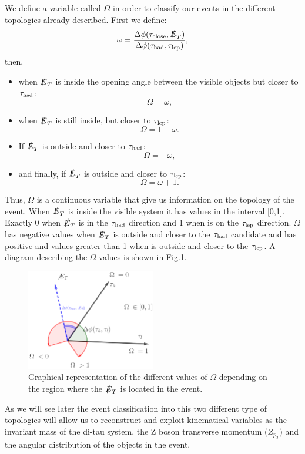 We define a variable called $\Omega$ in order to classify our events in the different topologies already described. First we define:
\begin{equation}
	\omega=\frac{\Delta\phi(\tau_{\text{close}},\slashed{E}_T)}{\Delta\phi(\tau_\text{had},\tau_\text{lep})},
\end{equation}
then,
\begin{itemize}
	\item when $\slashed{E}_T$ is inside the opening angle between the visible objects but closer to $\tau_\text{had}$:
	\begin{equation}
		\Omega=\omega,
	\end{equation}
	\item when $\slashed{E}_T$ is still inside, but closer to $\tau_\text{lep}$:
	\begin{equation}
		\Omega=1-\omega.
	\end{equation}
	\item If $\slashed{E}_T$ is outside and closer to $\tau_\text{had}$:
	\begin{equation}
		\Omega=-\omega,
	\end{equation}
	\item and finally, if $\slashed{E}_T$ is outside and closer to $\tau_\text{lep}$:
	\begin{equation}
		\Omega=\omega+1.
	\end{equation}
\end{itemize}
Thus, $\Omega$ is a continuous variable that give us information on the topology of the event. When $\slashed{E}_T$ is inside the visible system it has values in the interval [0,1]. Exactly 0 when $\slashed{E}_T$ is in the $\tau_\text{had}$ direction and 1 when is on the $\tau_\text{lep}$ direction. $\Omega$ has negative values when $\slashed{E}_T$ is outside and closer to the $\tau_\text{had}$ candidate and has positive and values greater than 1 when is outside and closer to the $\tau_\text{lep}$. A diagram describing the $\Omega$ values is shown in Fig.\ref{Fig8}.
\begin{figure}[h]
	\centering
	\includegraphics[width=0.5\textwidth]{figures/Fig8}
	\caption{Graphical representation of the different values of $\Omega$ depending on the region where the $\slashed{E}_T$ is located in the event.}
	\label{Fig8}
\end{figure}
As we will see later the event classification into this two different type of topologies will allow us to reconstruct and exploit kinematical variables as the invariant mass of the di-tau system, the Z boson transverse momentum ($Z_{p_T}$) and the angular distribution of the objects in the event.
